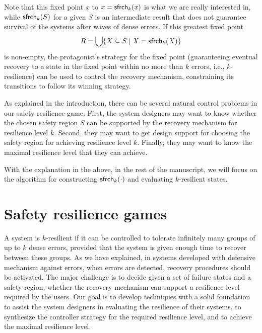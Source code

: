 Note that this fixed point $x$ to $x=\mathsf{sfrch}_k(x)$ is what we are really interested in, 
while $\mathsf{sfrch}_k(S)$ for a given $S$ is an intermediate result that does not 
guarantee survival of the systems after waves of dense errors.
If this greatest fixed point
$$R = \bigcup\{X \subseteq S \mid X = \mathsf{sfrch}_k ( X )\}$$ is non-empty, 
the protagonist's strategy for 
the fixed point (guaranteeing eventual recovery 
to a state in the fixed point within no more than $k$ errors, i.e., $k$-resilience) 
can be used to control the recovery mechanism, 
constraining its transitions to follow its winning strategy.

As explained in the introduction, 
there can be several natural control problems in our safety resilience game.
First, the system designers may want to know whether the chosen safety region $S$ can 
be supported by the recovery mechanism for resilience level $k$.  
Second, they may want to get design support for choosing the safety region 
for achieving resilience level $k$.  
Finally, they may want to know the maximal resilience level that they can achieve. 


With the explanation in the above, in the rest of the manuscript, 
we will focus on the algorithm for constructing 
$\mathsf{sfrch}_k(\cdot)$ and evaluating $k$-resilient states. 



\section{Safety resilience games}
A system is $k$-resilient if it
can be controlled to tolerate infinitely many groups of up to $k$ dense errors, 
provided that the system is given enough time to recover between these groups.
As we have explained, in systems developed with defensive mechanism against errors,  
when errors are detected, recovery procedures should be activated.  
The major challenge is to decide given a set of failure states and a safety region,
whether 
the recovery mechanism can support a resilience level required\label{reply1.prescribed.2.required} by the users. 
Our goal is to develop techniques with a solid foundation to 
assist the system designers in evaluating the resilience of their systems, 
to synthesize the controller strategy for the required resilience level, and 
to achieve the maximal resilience level. 


